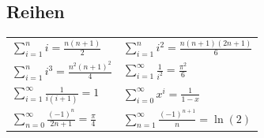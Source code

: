 \documentclass[7pt,landscape, margin = 0.1mm]{article}
\begin{document}
\begin{multicols}{4}
\begin{flushleft}
\subsection{Reihen}
\begin{center}
  \begin{tabularx}{\linewidth}{XX}
    \toprule
    $\sum_{i=1}^{n} i = \frac{n(n+1)}{2}$ & $\sum_{i=1}^{n} i^2 = \frac{n(n+1)(2n+1)}{6}$ \\
    $\sum_{i=1}^{n} i^3 = \frac{n^2 (n+1)^2}{4} $ & $\sum_{i=1}^{\infty} \frac{1}{i^2} = \frac{\pi ^2}{6}$ \\
    $\sum_{i=1}^{ \infty} \frac{1}{i (i+1	)} =1$ &$\sum_{i=0}^{\infty} x^i = \frac{1}{1-x}$\\
     $\sum_{n=0}^{\infty}\frac{(-1)^n}{2n+1} = \frac{\pi}{4}$& $\sum_{n=1}^{\infty}\frac{(-1)^{n+1}}{n} = \ln(2)$  \\
    
    
    \bottomrule
  \end{tabularx}
\end{center}





\end{flushleft}
\end{multicols}
\end{document}
